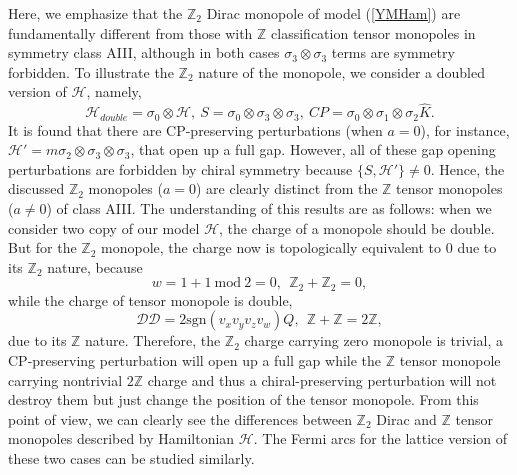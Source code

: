 \documentclass[twocolumn,prl,10pt,superscriptaddress]{revtex4}
\begin{document}
\begin{appendix}
Here, we emphasize that the $\mathbb{Z}_2$ Dirac monopole of model (\ref{YMHam}) are fundamentally different from those with $\mathbb{Z}$ classification tensor monopoles in symmetry class AIII, although in both cases $\sigma_3\otimes\sigma_3$ terms are symmetry forbidden. To illustrate the $\mathbb{Z}_2$ nature of the monopole, we consider a doubled version of $\mathcal{H}$, namely,
\begin{equation}
\mathcal{H}_{double}=\sigma_0\otimes\mathcal{H},  ~S=\sigma_0\otimes\sigma_3\otimes\sigma_3, ~ CP=\sigma_0\otimes\sigma_1\otimes\sigma_2\hat{K}.
\end{equation}
It is found that there are CP-preserving perturbations (when $a=0$),
for instance, $\mathcal{H}'=m\sigma_2\otimes \sigma_3\otimes\sigma_3$, that open up a full gap. However, all of these gap opening perturbations are
forbidden by chiral symmetry because $\{S,\mathcal{H}'\}\neq0$. Hence, the discussed $\mathbb{Z}_2$ monopoles ($a=0$) are clearly distinct from the $\mathbb{Z}$ tensor monopoles ($a\neq 0$) of
class AIII.  The understanding of this results are as follows: when we consider two copy of our model $\mathcal{H}$, the charge of a monopole should be double. But for the $\mathbb{Z}_2$ monopole, the charge now is topologically equivalent to 0 due to its $\mathbb{Z}_2$ nature, because
\begin{equation}
w=1+1~\text{mod}~ 2=0, ~~ \mathbb{Z}_2+\mathbb{Z}_2=0,
\end{equation}
while the charge of tensor monopole is double,
\begin{equation}
\mathcal{DD}=2\text{sgn}(v_xv_yv_zv_w)Q,~~\mathbb{Z}+\mathbb{Z}=2\mathbb{Z},
\end{equation}
due to its $\mathbb{Z}$ nature. Therefore, the $\mathbb{Z}_2$ charge carrying zero monopole is trivial, a CP-preserving perturbation will open up a full gap while the $\mathbb{Z}$ tensor monopole carrying nontrivial $2\mathbb{Z}$ charge and thus a chiral-preserving perturbation will not destroy them but just change the position of the tensor monopole. From this point of view, we can clearly see the differences between $\mathbb{Z}_2$ Dirac and $\mathbb{Z}$ tensor monopoles described by Hamiltonian $\mathcal{H}$.  The Fermi arcs for the lattice version of these two cases can be studied similarly.



\end{appendix}
\end{document}
